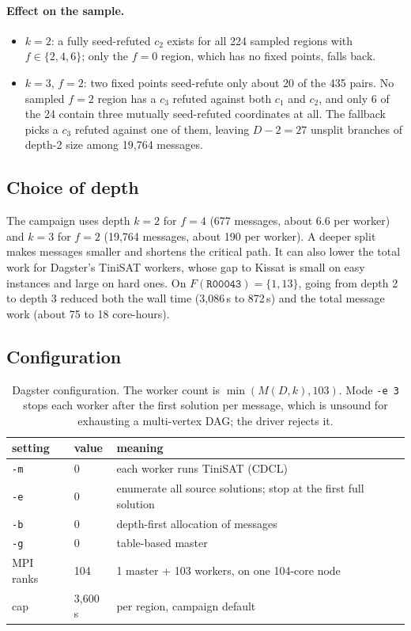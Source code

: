 \documentclass[11pt,a4paper]{article}
\theoremstyle{definition}
\newcommand{\code}[1]{\texttt{#1}}
\begin{document}
\paragraph{Effect on the sample.}
\begin{itemize}
\item $k=2$: a fully seed-refuted $c_2$ exists for all 224 sampled regions with
$f\in\{2,4,6\}$; only the $f=0$ region, which has no fixed points, falls back.
\item $k=3$, $f=2$: two fixed points seed-refute only about 20 of the 435 pairs. No sampled
$f=2$ region has a $c_3$ refuted against both $c_1$ and $c_2$, and only 6 of the 24 contain
three mutually seed-refuted coordinates at all. The fallback picks a $c_3$ refuted against
one of them, leaving $D-2=27$ unsplit branches of depth-2 size among 19{,}764 messages.
\end{itemize}

\subsection{Choice of depth}

The campaign uses depth $k=2$ for $f=4$ (677 messages, about 6.6 per worker) and $k=3$ for
$f=2$ (19{,}764 messages, about 190 per worker). A deeper split makes messages smaller and
shortens the critical path. It can also lower the total work for Dagster's TiniSAT workers,
whose gap to Kissat is small on easy instances and large on hard ones. On $F(\code{R00043})=\{1,13\}$,
going from depth 2 to depth 3 reduced both the wall time (3{,}086\,s to 872\,s) and the
total message work (about 75 to 18 core-hours).

\subsection{Configuration}

\begin{table}[H]
\centering
\begin{tabular}{@{}lll@{}}
\toprule
setting & value & meaning \\
\midrule
\code{-m} & 0 & each worker runs TiniSAT (CDCL) \\
\code{-e} & 0 & enumerate all source solutions; stop at the first full solution \\
\code{-b} & 0 & depth-first allocation of messages \\
\code{-g} & 0 & table-based master \\
MPI ranks & 104 & 1 master + 103 workers, on one 104-core node \\
cap & 3{,}600\,s & per region, campaign default \\
\bottomrule
\end{tabular}
\caption{Dagster configuration. The worker count is $\min(M(D,k),103)$. Mode \code{-e 3}
stops each worker after the first solution per message, which is unsound for exhausting a
multi-vertex DAG; the driver rejects it.}
\label{tab:config}
\end{table}
\end{document}
